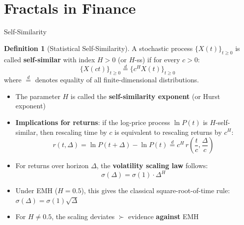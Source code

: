 \documentclass[9pt, aspectratio=169, t]{beamer}
\theoremstyle{definition}
\newtheorem{defn}{Definition}
\begin{document}
\section{Fractals in Finance}

\begin{frame}{Self-Similarity}
    \begin{defn}[Statistical Self-Similarity]
        A stochastic process $\{X(t)\}_{t \geq 0}$ is called \textbf{self-similar} with index $H > 0$ (or $H$-ss) if for every $c > 0$:
        \[
            \{X(ct)\}_{t \geq 0} \stackrel{d}{=} \{c^H X(t)\}_{t \geq 0}
        \]
        where $\stackrel{d}{=}$ denotes equality of all finite-dimensional distributions.
    \end{defn}
    \begin{itemize}
        \item The parameter $H$ is called the \textbf{self-similarity exponent} (or Hurst exponent)
        \item \textbf{Implications for returns}: if the log-price process $\ln P(t)$ is $H$-self-similar, then rescaling time by $c$ is equivalent to rescaling returns by $c^H$:
        \[
            r(t, \Delta) = \ln P(t+\Delta) - \ln P(t) \stackrel{d}{=} c^H \, r\!\left(\frac{t}{c}, \frac{\Delta}{c}\right)
        \]
        \item For returns over horizon $\Delta$, the \textbf{volatility scaling law} follows:
        \[
            \sigma(\Delta) = \sigma(1) \cdot \Delta^{H}
        \]
        \item Under EMH ($H = 0.5$), this gives the classical square-root-of-time rule: $\sigma(\Delta) = \sigma(1) \sqrt{\Delta}$
        \item For $H \neq 0.5$, the scaling deviates $\succ$ evidence \textbf{against} EMH
    \end{itemize}
\end{frame}
\end{document}
